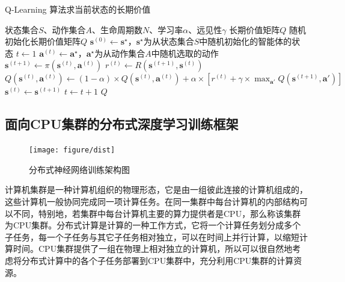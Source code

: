 \begin{algorithm}
    \caption{Q-Learning 算法求当前状态的长期价值}
    \label{alg:qlearning}
    \begin{algorithmic}[1]
        \Require 状态集合$S$、动作集合$A$、生命周期数$N$、学习率$\alpha$、远见性$\gamma$
        \Ensure 长期价值矩阵$Q$
            \State 随机初始化长期价值矩阵$Q$
                \State $\boldsymbol{s}^{(0)}\gets\boldsymbol{s}^\star$，$\boldsymbol{s}^\star$为从状态集合$S$中随机初始化的智能体的状态
                \State $t\gets1$
                \Repeat
                    \State $\boldsymbol{a}^{(t)}\gets \boldsymbol{a}^\star$，$\boldsymbol{a}^\star$为从动作集合$A$中随机选取的动作
                    \State $\boldsymbol{s}^{(t+1)}\gets \pi\left(\boldsymbol{s}^{(t)}, \boldsymbol{a}^{(t)}\right)$
                    \State $r^{(t)}\gets R\left(\boldsymbol{s}^{(t+1)},\boldsymbol{s}^{(t)}\right)$
                    \State $Q\left(\boldsymbol{s}^{(t)},\boldsymbol{a}^{(t)}\right)\gets(1-\alpha)\times Q\left(\boldsymbol{s}^{(t)},\boldsymbol{a}^{(t)}\right)+\alpha\times\left[r^{(t)}+\gamma\times\max_{\boldsymbol{a}'}Q\left(\boldsymbol{s}^{(t+1)}, \boldsymbol{a}'\right)\right]$
                    \State $\boldsymbol{s}^{(t)}\gets\boldsymbol{s}^{(t+1)}$
                    \State $t\gets  t+1$
            \EndFor
            \State\Return $Q$
        \EndFunction
    \end{algorithmic}
\end{algorithm}

\subsection{面向CPU集群的分布式深度学习训练框架}

\begin{figure}
\centering
\texttt{[image: figure/dist]}
\caption{分布式神经网络训练架构图}
\label{fig:dist}
\end{figure}

计算机集群是一种计算机组织的物理形态，它是由一组彼此连接的计算机组成的，这些计算机一般协同完成同一项计算任务。在同一集群中每台计算机的内部结构可以不同，特别地，若集群中每台计算机主要的算力提供者是CPU，那么称该集群为CPU集群。分布式计算是计算的一种工作方式，它将一个计算任务划分成多个子任务，每一个子任务与其它子任务相对独立，可以在时间上并行计算，以缩短计算时间。CPU集群提供了一组在物理上相对独立的计算机，所以可以很自然地考虑将分布式计算中的各个子任务部署到CPU集群中，充分利用CPU集群的计算资源。

